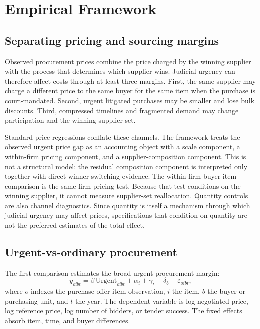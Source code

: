 \section{Empirical Framework}
\label{sec:framework}

\subsection{Separating pricing and sourcing margins}
\label{subsec:pricing_sourcing}

Observed procurement prices combine the price charged by the winning supplier with the process that determines which supplier wins. Judicial urgency can therefore affect costs through at least three margins. First, the same supplier may charge a different price to the same buyer for the same item when the purchase is court-mandated. Second, urgent litigated purchases may be smaller and lose bulk discounts. Third, compressed timelines and fragmented demand may change participation and the winning supplier set.

Standard price regressions conflate these channels. The framework treats the observed urgent price gap as an accounting object with a scale component, a within-firm pricing component, and a supplier-composition component. This is not a structural model: the residual composition component is interpreted only together with direct winner-switching evidence. The within firm-buyer-item comparison is the same-firm pricing test. Because that test conditions on the winning supplier, it cannot measure supplier-set reallocation. Quantity controls are also channel diagnostics. Since quantity is itself a mechanism through which judicial urgency may affect prices, specifications that condition on quantity are not the preferred estimates of the total effect.

\subsection{Urgent-vs-ordinary procurement}
\label{subsec:uo}

The first comparison estimates the broad urgent-procurement margin:
\begin{equation}
y_{oibt}=\beta\,\text{Urgent}_{oibt}+\alpha_i+\gamma_t+\delta_b+\varepsilon_{oibt},
\label{eq:urgent_ordinary}
\end{equation}
where $o$ indexes the purchase-offer-item observation, $i$ the item, $b$ the buyer or purchasing unit, and $t$ the year. The dependent variable is log negotiated price, log reference price, log number of bidders, or tender success. The fixed effects absorb item, time, and buyer differences.

